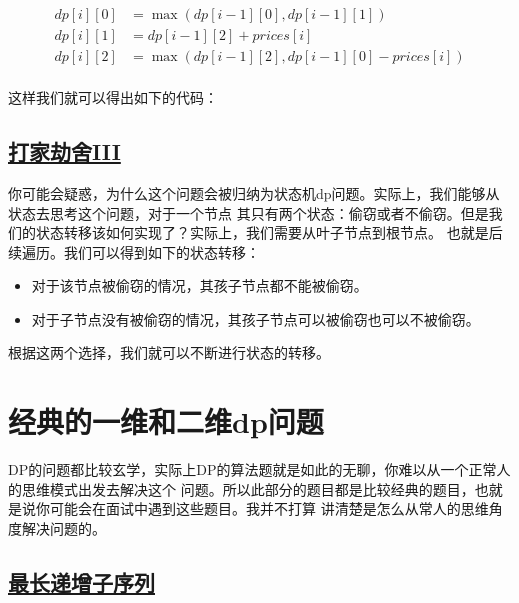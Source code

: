 \documentclass[../../main.tex]{subfiles}
\begin{document}
\begin{align*}
  dp[i][0] &= \max(dp[i - 1][0], dp[i - 1][1]) \\
  dp[i][1] &= dp[i - 1][2] + prices[i] \\
  dp[i][2] &= \max(dp[i - 1][2], dp[i - 1][0] - prices[i]) \\
\end{align*}

这样我们就可以得出如下的代码：



\subsection{\href{https://leetcode.cn/problems/house-robber-iii/}{打家劫舍III}}

你可能会疑惑，为什么这个问题会被归纳为状态机dp问题。实际上，我们能够从状态去思考这个问题，对于一个节点
其只有两个状态：偷窃或者不偷窃。但是我们的状态转移该如何实现了？实际上，我们需要从叶子节点到根节点。
也就是后续遍历。我们可以得到如下的状态转移：

\begin{itemize}
  \item 对于该节点被偷窃的情况，其孩子节点都不能被偷窃。
  \item 对于子节点没有被偷窃的情况，其孩子节点可以被偷窃也可以不被偷窃。
\end{itemize}

根据这两个选择，我们就可以不断进行状态的转移。



\section{经典的一维和二维dp问题}

DP的问题都比较玄学，实际上DP的算法题就是如此的无聊，你难以从一个正常人的思维模式出发去解决这个
问题。所以此部分的题目都是比较经典的题目，也就是说你可能会在面试中遇到这些题目。我并不打算
讲清楚是怎么从常人的思维角度解决问题的。

\subsection{\href{https://leetcode.cn/problems/longest-increasing-subsequence/}
{最长递增子序列}}
\end{document}
